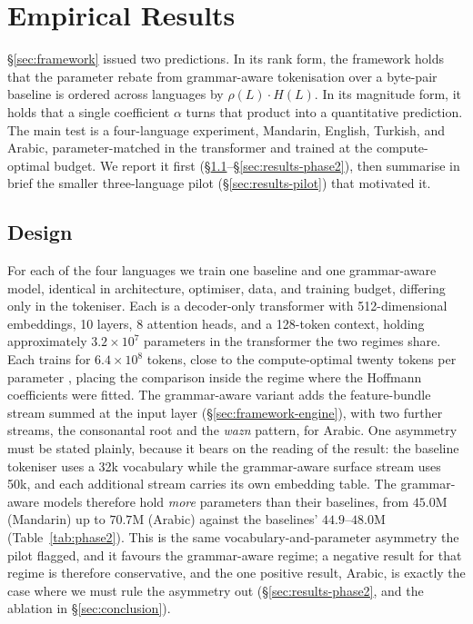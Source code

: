 \section{Empirical Results}
\label{sec:results}

\S\ref{sec:framework} issued two predictions. In its rank form, the framework holds that the parameter rebate from grammar-aware tokenisation over a byte-pair baseline is ordered across languages by $\rho(L) \cdot H(L)$. In its magnitude form, it holds that a single coefficient $\alpha$ turns that product into a quantitative prediction. The main test is a four-language experiment, Mandarin, English, Turkish, and Arabic, parameter-matched in the transformer and trained at the compute-optimal budget. We report it first (\S\ref{sec:results-design}--\S\ref{sec:results-phase2}), then summarise in brief the smaller three-language pilot (\S\ref{sec:results-pilot}) that motivated it.

\subsection{Design}
\label{sec:results-design}

For each of the four languages we train one baseline and one grammar-aware model, identical in architecture, optimiser, data, and training budget, differing only in the tokeniser. Each is a decoder-only transformer with 512-dimensional embeddings, 10 layers, 8 attention heads, and a 128-token context, holding approximately $3.2 \times 10^7$ parameters in the transformer the two regimes share. Each trains for $6.4 \times 10^8$ tokens, close to the compute-optimal twenty tokens per parameter \citep{hoffmann2022}, placing the comparison inside the regime where the Hoffmann coefficients were fitted. The grammar-aware variant adds the feature-bundle stream summed at the input layer (\S\ref{sec:framework-engine}), with two further streams, the consonantal root and the \emph{wazn} pattern, for Arabic. One asymmetry must be stated plainly, because it bears on the reading of the result: the baseline tokeniser uses a 32k vocabulary while the grammar-aware surface stream uses 50k, and each additional stream carries its own embedding table. The grammar-aware models therefore hold \emph{more} parameters than their baselines, from $45.0$M (Mandarin) up to $70.7$M (Arabic) against the baselines' $44.9$--$48.0$M (Table~\ref{tab:phase2}). This is the same vocabulary-and-parameter asymmetry the pilot flagged, and it favours the grammar-aware regime; a negative result for that regime is therefore conservative, and the one positive result, Arabic, is exactly the case where we must rule the asymmetry out (\S\ref{sec:results-phase2}, and the ablation in \S\ref{sec:conclusion}).


